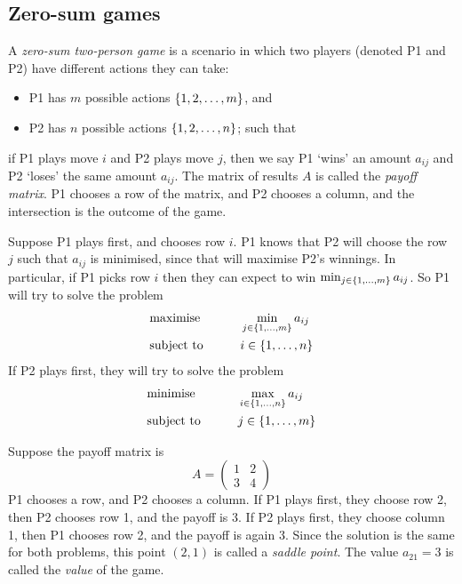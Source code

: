 \subsection{Zero-sum games}
\begin{definition}
	A \textit{zero-sum two-person game} is a scenario in which two players (denoted P1 and P2) have different actions they can take:
	\begin{itemize}
		\item P1 has \( m \) possible actions \( \qty{1, 2, \dots, m } \), and
		\item P2 has \( n \) possible actions \( \qty{1, 2, \dots, n } \); such that
	\end{itemize}
	if P1 plays move \( i \) and P2 plays move \( j \), then we say P1 `wins' an amount \( a_{ij} \) and P2 `loses' the same amount \( a_{ij} \).
	The matrix of results \( A \) is called the \textit{payoff matrix}.
	P1 chooses a row of the matrix, and P2 chooses a column, and the intersection is the outcome of the game.
\end{definition}
Suppose P1 plays first, and chooses row \( i \).
P1 knows that P2 will choose the row \( j \) such that \( a_{ij} \) is minimised, since that will maximise P2's winnings.
In particular, if P1 picks row \( i \) then they can expect to win \( \min_{j \in \qty{1,\dots,m}} a_{ij} \).
So P1 will try to solve the problem
\begin{alignat*}{2}
	 & \text{maximise}   & \qquad & \min_{j \in \qty{1,\dots,m}} a_{ij} \\
	 & \text{subject to} &        & i \in \qty{1,\dots,n}
\end{alignat*}
If P2 plays first, they will try to solve the problem
\begin{alignat*}{2}
	 & \text{minimise}   & \qquad & \max_{i \in \qty{1,\dots,n}} a_{ij} \\
	 & \text{subject to} &        & j \in \qty{1,\dots,m}
\end{alignat*}
\begin{example}
	Suppose the payoff matrix is
	\[
		A = \begin{pmatrix}
			1 & 2 \\ 3 & 4
		\end{pmatrix}
	\]
	P1 chooses a row, and P2 chooses a column.
	If P1 plays first, they choose row 2, then P2 chooses row 1, and the payoff is 3.
	If P2 plays first, they choose column 1, then P1 chooses row 2, and the payoff is again 3.
	Since the solution is the same for both problems, this point \( (2,1) \) is called a \textit{saddle point}.
	The value \( a_{21} = 3 \) is called the \textit{value} of the game.
\end{example}
